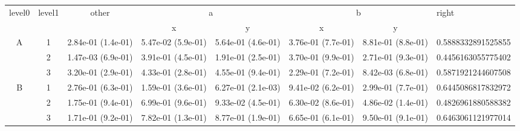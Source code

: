 \begin{tabular}{cccccccl}
\toprule
\multirow{2}{*}{level0} & \multirow{2}{*}{level1}& \multirow{2}{*}{other}&\multicolumn{2}{c}{a}&\multicolumn{2}{c}{b}& \multirow{2}{*}{right}\tabularnewline
\cmidrule(lr){4-5}
\cmidrule(lr){6-7}
&&&x&y&x&y\tabularnewline
\midrule
\multirow{3}{*}{A}&1& 2.84e-01 (1.4e-01)& 5.47e-02 (5.9e-01)& 5.64e-01 (4.6e-01)& 3.76e-01 (7.7e-01)& 8.81e-01 (8.8e-01)& 0.5888332891525855\tabularnewline
&2& 1.47e-03 (6.9e-01)& 3.91e-01 (4.5e-01)& 1.91e-01 (2.5e-01)& 3.70e-01 (9.9e-01)& 2.71e-01 (9.3e-01)& 0.4456163055775402\tabularnewline
&3& 3.20e-01 (2.9e-01)& 4.33e-01 (2.8e-01)& 4.55e-01 (9.4e-01)& 2.29e-01 (7.2e-01)& 8.42e-03 (6.8e-01)& 0.5871921244607508\tabularnewline
\midrule
\multirow{3}{*}{B}&1& 2.76e-01 (6.3e-01)& 1.59e-01 (3.6e-01)& 6.27e-01 (2.1e-03)& 9.41e-02 (6.2e-01)& 2.99e-01 (7.7e-01)& 0.6445086817832972\tabularnewline
&2& 1.75e-01 (9.4e-01)& 6.99e-01 (9.6e-01)& 9.33e-02 (4.5e-01)& 6.30e-02 (8.6e-01)& 4.86e-02 (1.4e-01)& 0.4826961880588382\tabularnewline
&3& 1.71e-01 (9.2e-01)& 7.82e-01 (1.3e-01)& 8.77e-01 (1.9e-01)& 6.65e-01 (6.1e-01)& 9.50e-01 (9.1e-01)& 0.6463061121977014\tabularnewline
\bottomrule
\end{tabular}
